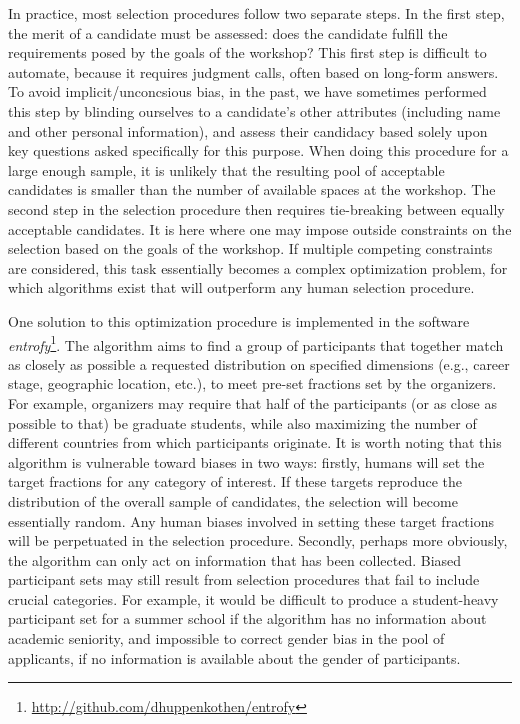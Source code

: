 In practice, most selection procedures follow two separate steps. In the first step, the merit of a candidate must be assessed: does the candidate fulfill the requirements posed by the goals of the workshop?
This first step is difficult to automate, because it requires judgment calls, often based on long-form answers.
To avoid implicit/unconcsious bias, in the past, we have sometimes performed this step by blinding ourselves to a candidate's other attributes (including name and other personal information), and assess their candidacy based solely upon key questions asked specifically for this purpose.
When doing this procedure for a large enough sample, it is unlikely that the resulting pool of acceptable candidates is smaller than the number of available spaces at the workshop.
The second step in the selection procedure then requires tie-breaking between equally acceptable candidates.
It is here where one may impose outside constraints on the selection based on the goals of the workshop.
If multiple competing constraints are considered, this task essentially becomes a complex optimization problem, for which algorithms exist that will outperform any human selection procedure.

One solution to this optimization procedure is implemented in the software \textit{entrofy}\footnote{\url{http://github.com/dhuppenkothen/entrofy}}. The algorithm aims to find a group of participants that together match as closely as possible a requested distribution on specified dimensions (e.g., career stage, geographic location, etc.), to meet pre-set fractions set by the organizers.
For example, organizers may require that half of the participants (or as close as possible to that) be graduate students, while also maximizing the number of different countries from which participants originate.
It is worth noting that this algorithm is vulnerable toward biases in two ways: firstly, humans will set the target fractions for any category of interest.
If these targets reproduce the distribution of the overall sample of candidates, the selection will become essentially random.
Any human biases involved in setting these target fractions will be perpetuated in the selection procedure.
Secondly, perhaps more obviously, the algorithm can only act on information that has been collected.
Biased participant sets may still result from selection procedures that fail to include crucial categories. For example, it would be difficult to produce a student-heavy participant set for a summer school if the algorithm has no information about academic seniority, and impossible to correct gender bias in the pool of applicants, if no information is available about the gender of participants.
